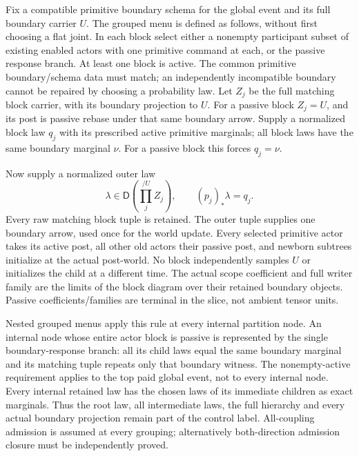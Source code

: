 \documentclass[11pt]{article}
\begin{document}
Fix a compatible primitive boundary schema for the global event and its full boundary carrier $U$. The grouped menu is defined as follows, without first choosing a flat joint. In each block select either a nonempty participant subset of existing enabled actors with one primitive command at each, or the passive response branch. At least one block is active. The common primitive boundary/schema data must match; an independently incompatible boundary cannot be repaired by choosing a probability law. Let $Z_j$ be the full matching block carrier, with its boundary projection to $U$. For a passive block $Z_j=U$, and its post is passive rebase under that same boundary arrow. Supply a normalized block law $q_j$ with its prescribed active primitive marginals; all block laws have the same boundary marginal $\nu$. For a passive block this forces $q_j=\nu$.

Now supply a normalized outer law
\[
 \lambda\in\mathsf D\left(\prod_j^{/U}Z_j\right),
 \qquad (p_j)_*\lambda=q_j.                           \tag{1}
\]
Every raw matching block tuple is retained. The outer tuple supplies one boundary arrow, used once for the world update. Every selected primitive actor takes its active post, all other old actors their passive post, and newborn subtrees initialize at the actual post-world. No block independently samples $U$ or initializes the child at a different time. The actual scope coefficient and full writer family are the limits of the block diagram over their retained boundary objects. Passive coefficients/families are terminal in the slice, not ambient tensor units.

Nested grouped menus apply this rule at every internal partition node. An internal node whose entire actor block is passive is represented by the single boundary-response branch: all its child laws equal the same boundary marginal and its matching tuple repeats only that boundary witness. The nonempty-active requirement applies to the top paid global event, not to every internal node. Every internal retained law has the chosen laws of its immediate children as exact marginals. Thus the root law, all intermediate laws, the full hierarchy and every actual boundary projection remain part of the control label. All-coupling admission is assumed at every grouping; alternatively both-direction admission closure must be independently proved.
\end{document}
